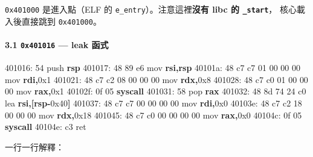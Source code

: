 \documentclass[10pt,a4paper]{article}
\newenvironment{Shaded}{\begin{snugshade}}{\end{snugshade}}
\newcommand{\BaseNTok}[1]{\textcolor[rgb]{0.00,0.00,0.81}{#1}}
\newcommand{\BuiltInTok}[1]{#1}
\newcommand{\ControlFlowTok}[1]{\textcolor[rgb]{0.13,0.29,0.53}{\textbf{#1}}}
\newcommand{\DecValTok}[1]{\textcolor[rgb]{0.00,0.00,0.81}{#1}}
\newcommand{\KeywordTok}[1]{\textcolor[rgb]{0.13,0.29,0.53}{\textbf{#1}}}
\newcommand{\NormalTok}[1]{#1}
\newcommand{\OperatorTok}[1]{\textcolor[rgb]{0.81,0.36,0.00}{\textbf{#1}}}
\renewenvironment{Shaded}{%
  \def\FrameCommand{\fboxsep=3.2pt\colorbox{shadecolor}}%
  \MakeFramed{\advance\hsize-\width\FrameRestore\small}%
}{%
  \endMakeFramed
}
\begin{document}
\texttt{0x401000} 是進入點（ELF 的
\texttt{e\_\allowbreak{}entry}）。注意這裡\textbf{沒有 libc 的 \texttt{\_\allowbreak{}start}}，
核心載入後直接跳到 \texttt{0x401000}。

\paragraph{\texorpdfstring{3.1 \texttt{0x401016} --- leak
函式}{3.1 0x401016 --- leak 函式}}\label{x401016-leak-ux51fdux5f0f}

\begin{Shaded}
\begin{Highlighting}[]
\NormalTok{  401016:  54                    }\BuiltInTok{push}   \KeywordTok{rsp}
\NormalTok{  401017:  48 89 e6              mov    }\KeywordTok{rsi}\OperatorTok{,}\KeywordTok{rsp}
\NormalTok{  40101a:  48 c7 c7 }\DecValTok{01} \DecValTok{00} \DecValTok{00} \DecValTok{00}\NormalTok{  mov    }\KeywordTok{rdi}\OperatorTok{,}\BaseNTok{0x1}
\NormalTok{  401021:  48 c7 c2 }\DecValTok{08} \DecValTok{00} \DecValTok{00} \DecValTok{00}\NormalTok{  mov    }\KeywordTok{rdx}\OperatorTok{,}\BaseNTok{0x8}
\NormalTok{  401028:  48 c7 c0 }\DecValTok{01} \DecValTok{00} \DecValTok{00} \DecValTok{00}\NormalTok{  mov    }\KeywordTok{rax}\OperatorTok{,}\BaseNTok{0x1}
\NormalTok{  40102f:  0f 05                 }\ControlFlowTok{syscall}
\NormalTok{  401031:  58                    }\BuiltInTok{pop}    \KeywordTok{rax}
\NormalTok{  401032:  48 8d 74 24 c0        lea    }\KeywordTok{rsi}\OperatorTok{,[}\KeywordTok{rsp}\OperatorTok{{-}}\BaseNTok{0x40}\OperatorTok{]}
\NormalTok{  401037:  48 c7 c7 }\DecValTok{00} \DecValTok{00} \DecValTok{00} \DecValTok{00}\NormalTok{  mov    }\KeywordTok{rdi}\OperatorTok{,}\BaseNTok{0x0}
\NormalTok{  40103e:  48 c7 c2 }\DecValTok{18} \DecValTok{00} \DecValTok{00} \DecValTok{00}\NormalTok{  mov    }\KeywordTok{rdx}\OperatorTok{,}\BaseNTok{0x18}
\NormalTok{  401045:  48 c7 c0 }\DecValTok{00} \DecValTok{00} \DecValTok{00} \DecValTok{00}\NormalTok{  mov    }\KeywordTok{rax}\OperatorTok{,}\BaseNTok{0x0}
\NormalTok{  40104c:  0f 05                 }\ControlFlowTok{syscall}
\NormalTok{  40104e:  c3                    ret}
\end{Highlighting}
\end{Shaded}

一行一行解釋：
\end{document}
